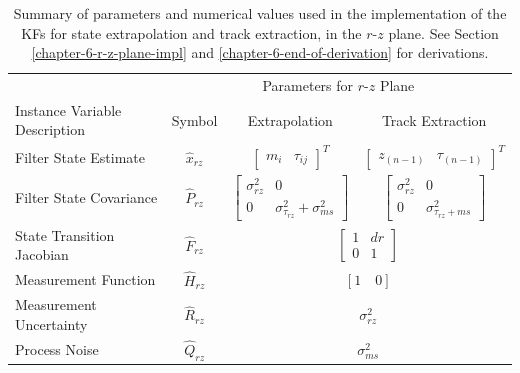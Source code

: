 \begin{table}[!htbp]
\caption{Summary of parameters and numerical values used in the implementation of the KFs for state extrapolation and track extraction, in the $r$-$z$ plane. See Section \ref{chapter-6-r-z-plane-impl} and \ref{chapter-6-end-of-derivation} for derivations.}
\begin{center}
\begin{tabular}{lccc}
\toprule

& \multicolumn{3}{c}{Parameters for $r$-$z$ Plane} \\
Instance Variable Description & Symbol  & Extrapolation  & Track Extraction  \\
\hline
\rule{0pt}{3ex}%


Filter State Estimate
& $\hat{x}_{rz}$
& $\begin{bmatrix} m_i & \tau_{ij} \end{bmatrix}^{T}$
& $\begin{bmatrix} z_{(n-1)} & \tau_{(n-1)} \end{bmatrix}^{T}$
\\
\rule{0pt}{4ex}%

Filter State Covariance
& $\hat{P}_{rz}$
& $\begin{bmatrix} \sigma_{rz}^2 & 0 \\ 0 & \sigma_{\tau_{rz}}^2 + \sigma_{ms}^2\end{bmatrix}$
& $\begin{bmatrix} \sigma_{rz}^2 & 0 \\ 0 & \sigma_{\tau_{rz} + ms}^2\end{bmatrix}$
\\
\rule{0pt}{4ex}%

State Transition Jacobian
& $\hat{F}_{rz}$ 
& \multicolumn{2}{c}{$\begin{bmatrix} 1 & dr \\ 0 & 1 \end{bmatrix}$}
\\
\rule{0pt}{3ex}%

Measurement Function
& $\hat{H}_{rz}$ 
& \multicolumn{2}{c}{$[1 \quad 0]$}
\\
\rule{0pt}{3ex}%

Measurement Uncertainty
& $\hat{R}_{rz}$ 
& \multicolumn{2}{c}{$\sigma_{rz}^2$}
\\
\rule{0pt}{3ex}%

Process Noise
& $\hat{Q}_{rz}$ 
& \multicolumn{2}{c}{$\sigma_{ms}^2$}
\\  
              

\bottomrule

\end{tabular}
\end{center}
\label{tab:kf-instance-variables-rz}
\end{table}

















